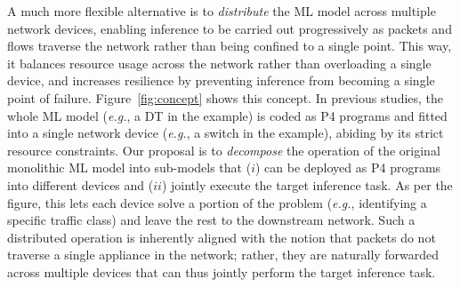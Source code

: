 \documentclass[journal]{IEEEtran}
\theoremstyle{plain} %
\newcommand{\eg}{\textit{e.g.},\xspace}
\begin{document}

A much more flexible alternative is to \textit{distribute} the ML model across multiple network devices, enabling inference to be carried out progressively as packets and flows traverse the network rather than being confined to a single point. This way, it balances resource usage across the network rather than overloading a single device, and increases resilience by preventing inference from becoming a single point of failure.
%
Figure~\ref{fig:concept} shows this concept. In previous studies, the whole ML model (\eg a DT in the example) is coded as P4 programs and fitted into a single network device (\eg a switch in the example), abiding by its strict resource constraints.
Our proposal is to \textit{decompose} the operation of the original monolithic ML model into sub-models that ($i$) can be deployed as P4 programs into different devices and ($ii$) jointly execute the target inference task. As per the figure, this lets each device solve a portion of the problem (\eg identifying a specific traffic class) and leave the rest to the downstream network.
Such a distributed operation is inherently aligned with the notion that packets do not traverse a single appliance in the network; rather, they are naturally forwarded across multiple devices that can thus jointly perform the target inference task.
\end{document}
